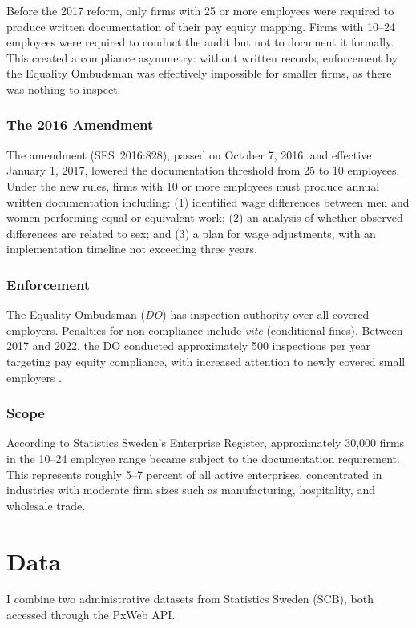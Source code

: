 \documentclass[12pt]{article}
\begin{document}
Before the 2017 reform, only firms with 25 or more employees were required to produce written documentation of their pay equity mapping. Firms with 10--24 employees were required to conduct the audit but not to document it formally. This created a compliance asymmetry: without written records, enforcement by the Equality Ombudsman was effectively impossible for smaller firms, as there was nothing to inspect.

\subsubsection*{The 2016 Amendment} The amendment (SFS~2016:828), passed on October 7, 2016, and effective January 1, 2017, lowered the documentation threshold from 25 to 10 employees. Under the new rules, firms with 10 or more employees must produce annual written documentation including: (1) identified wage differences between men and women performing equal or equivalent work; (2) an analysis of whether observed differences are related to sex; and (3) a plan for wage adjustments, with an implementation timeline not exceeding three years.

\subsubsection*{Enforcement} The Equality Ombudsman (\textit{DO}) has inspection authority over all covered employers. Penalties for non-compliance include \textit{vite} (conditional fines). Between 2017 and 2022, the DO conducted approximately 500 inspections per year targeting pay equity compliance, with increased attention to newly covered small employers \citep{do2020annual}.

\subsubsection*{Scope} According to Statistics Sweden's Enterprise Register, approximately 30,000 firms in the 10--24 employee range became subject to the documentation requirement. This represents roughly 5--7 percent of all active enterprises, concentrated in industries with moderate firm sizes such as manufacturing, hospitality, and wholesale trade.

\section{Data}
\label{sec:data}

I combine two administrative datasets from Statistics Sweden (SCB), both accessed through the PxWeb API.
\end{document}
